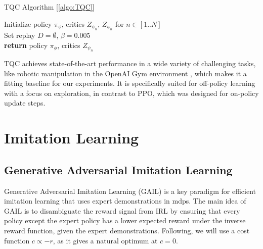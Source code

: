 \begin{algorithm}
    \caption{TQC Algorithm [\ref{algo:TQC}]}
    \label{algo:TQC}
    \begin{algorithmic}
        \State Initialize policy $\pi_{\phi}$, critics $Z_{\psi_n}$, $Z_{\psi_n}$ for $n \in [1..N]$\\
        \State Set replay $D = \emptyset$, $\beta = 0.005$\\
        \State \textbf{return} policy $\pi_{\phi}$, critics $Z_{\psi_n}$
    \end{algorithmic}
\end{algorithm}
TQC achieves state-of-the-art performance in a wide variety of challenging tasks, like robotic manipulation in the OpenAI Gym environment \cite{1606.01540}, which makes it a fitting baseline 
for our experiments. It is specifically suited 
for off-policy learning with a focus on exploration, in contrast to PPO, which was designed for on-policy update steps.

\section{Imitation Learning}
\subsection{Generative Adversarial Imitation Learning}
Generative Adversarial Imitation Learning (GAIL) \cite{ho2016generative} is a key paradigm for efficient imitation learning that uses expert demonstrations in \ac{mdp}s. 
The main idea of GAIL is to disambiguate the reward signal from IRL by ensuring that every policy except the expert policy has a lower expected reward under the inverse reward function, given the expert 
demonstrations. Following, we will use a cost function $c \propto -r$, as it gives a natural optimum at $c=0$.\\


